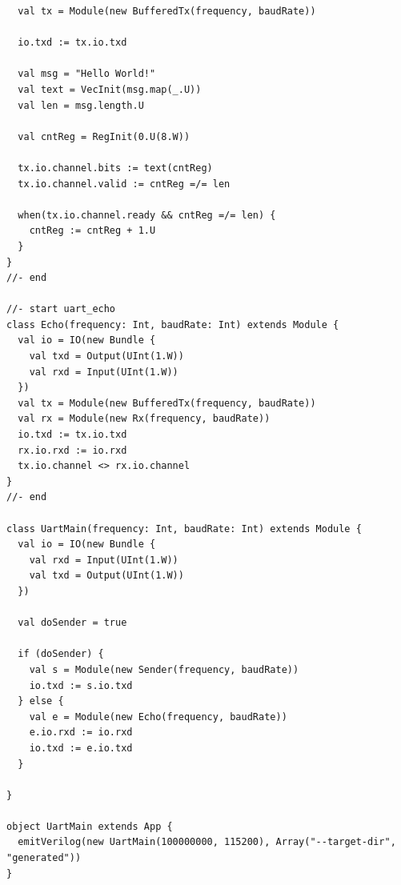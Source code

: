 \begin{lstlisting}
  val tx = Module(new BufferedTx(frequency, baudRate))

  io.txd := tx.io.txd

  val msg = "Hello World!"
  val text = VecInit(msg.map(_.U))
  val len = msg.length.U

  val cntReg = RegInit(0.U(8.W))

  tx.io.channel.bits := text(cntReg)
  tx.io.channel.valid := cntReg =/= len

  when(tx.io.channel.ready && cntReg =/= len) {
    cntReg := cntReg + 1.U
  }
}
//- end

//- start uart_echo
class Echo(frequency: Int, baudRate: Int) extends Module {
  val io = IO(new Bundle {
    val txd = Output(UInt(1.W))
    val rxd = Input(UInt(1.W))
  })
  val tx = Module(new BufferedTx(frequency, baudRate))
  val rx = Module(new Rx(frequency, baudRate))
  io.txd := tx.io.txd
  rx.io.rxd := io.rxd
  tx.io.channel <> rx.io.channel
}
//- end

class UartMain(frequency: Int, baudRate: Int) extends Module {
  val io = IO(new Bundle {
    val rxd = Input(UInt(1.W))
    val txd = Output(UInt(1.W))
  })

  val doSender = true

  if (doSender) {
    val s = Module(new Sender(frequency, baudRate))
    io.txd := s.io.txd
  } else {
    val e = Module(new Echo(frequency, baudRate))
    e.io.rxd := io.rxd
    io.txd := e.io.txd
  }

}

object UartMain extends App {
  emitVerilog(new UartMain(100000000, 115200), Array("--target-dir", "generated"))
}
\end{lstlisting}
